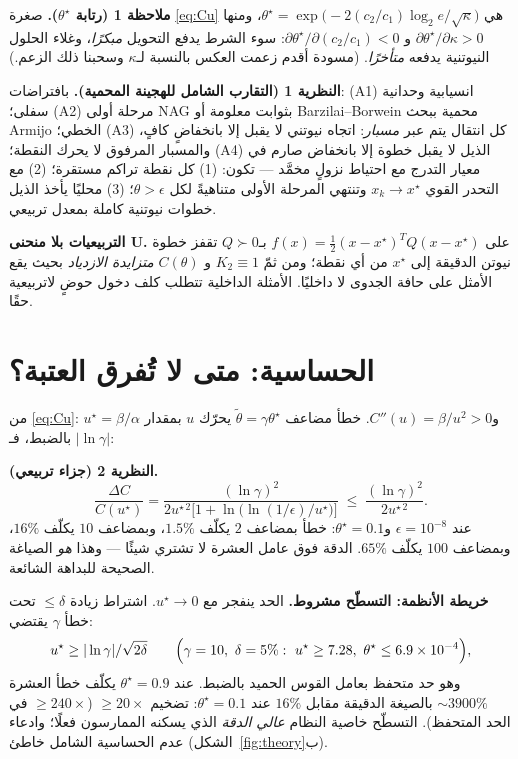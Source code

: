 ﻿\documentclass[12pt]{article}
\newcommand{\thetastar}{\theta^{\star}}
\begin{document}
\textbf{ملاحظة 1 (رتابة $\thetastar$).}\label{rem:mono}
صغرة \eqref{eq:Cu} هي
$\thetastar=\exp\!\bigl(-2(c_2/c_1)\log_2e/\sqrt\kappa\bigr)$، ومنها
$\partial\thetastar/\partial\kappa>0$ و
$\partial\thetastar/\partial(c_2/c_1)<0$: سوء الشرط يدفع التحويل
\emph{مبكرًا}، وغلاء الحلول النيوتنية يدفعه \emph{متأخرًا}. (مسودة
أقدم زعمت العكس بالنسبة لـ$\kappa$ وسحبنا ذلك الزعم.)

\textbf{النظرية 1 (التقارب الشامل للهجينة المحمية).}\label{lem:glob}
بافتراضات: (A1) انسيابية وحدانية سفلى؛ (A2) مرحلة أولى NAG
بثوابت معلومة أو Barzilai--Borwein محمية ببحث Armijo الخطي؛ (A3) كل
انتقال يتم عبر \emph{مسبار}: اتجاه نيوتني لا يقبل إلا بانخفاضٍ كافٍ،
والمسبار المرفوق لا يحرك النقطة؛ (A4) الذيل لا يقبل خطوة إلا
بانخفاض صارم في معيار التدرج مع احتياط نزولٍ مخمَّد --- تكون:
(1) كل نقطة تراكم مستقرة؛ (2) مع التحدر القوي $x_k\to x^\star$ وتنتهي
المرحلة الأولى متناهيةً لكل $\theta>\epsilon$؛ (3) محليًا يأخذ الذيل
خطوات نيوتنية كاملة بمعدل تربيعي.

\textbf{التربيعيات بلا منحنى U.}\label{prop:quad}
على $f(x)=\tfrac12(x-x^\star)^TQ(x-x^\star)$ بـ$Q\succ0$ تقفز خطوة
نيوتن الدقيقة إلى $x^\star$ من أي نقطة؛ ومن ثمّ $K_2\equiv1$ و
$C(\theta)$ \emph{متزايدة الازدياد} بحيث يقع الأمثل على حافة الجدوى
لا داخليًا. الأمثلة الداخلية تتطلب كلف دخول حوضٍ لاتربيعية حقًا.

\section{الحساسية: متى لا تُفرق العتبة؟}\label{sec:sens}

من \eqref{eq:Cu}: $u^\star=\beta/\alpha$ و$C''(u)=\beta/u^{2}>0$.
خطأ مضاعف $\tilde\theta=\gamma\thetastar$ يحرّك $u$ بمقدار
$|\ln\gamma|$ بالضبط، فـ:

\textbf{النظرية 2 (جزاء تربيعي).}\label{lem:sens}
\[
\frac{\Delta C}{C(u^\star)}
=\frac{(\ln\gamma)^2}{2u^{\star\,2}\bigl[1+\ln\!\bigl(\ln(1/\epsilon)/u^\star\bigr)\bigr]}
\;\le\;\frac{(\ln\gamma)^2}{2u^{\star\,2}} .
\]
عند $\epsilon=10^{-8}$ و$\thetastar=0.1$: خطأ بمضاعف $2$ يكلّف
$1.5\%$، وبمضاعف $10$ يكلّف $16\%$، وبمضاعف $100$ يكلّف $65\%$. الدقة
فوق عامل العشرة لا تشتري شيئًا --- وهذا \emph{هو} الصياغة الصحيحة
للبداهة الشائعة.

\textbf{خريطة الأنظمة: التسطّح مشروط.}
الحد ينفجر مع $u^\star\to0$. اشتراط زيادة $\le\delta$ تحت خطأ
$\gamma$ يقتضي:
\begin{equation}
u^\star\ge|\ln\gamma|/\sqrt{2\delta}
\qquad\Bigl(\gamma=10,\ \delta=5\%:\ u^\star\ge7.28,\
\thetastar\le6.9\times10^{-4}\Bigr),
\end{equation}
وهو حد متحفظ بعامل القوس الحميد بالضبط. عند $\thetastar=0.9$ يكلّف
خطأ العشرة ${\sim}3900\%$ بالصيغة الدقيقة مقابل $16\%$ عند
$\thetastar=0.1$: تضخيم $\ge20\times$ ($\ge240\times$ في الحد
المتحفظ). التسطّح خاصية النظام \emph{عالي الدقة} الذي يسكنه
الممارسون فعلًا؛ وادعاء عدم الحساسية الشامل خاطئ
(الشكل~\ref{fig:theory}ب).
\end{document}
